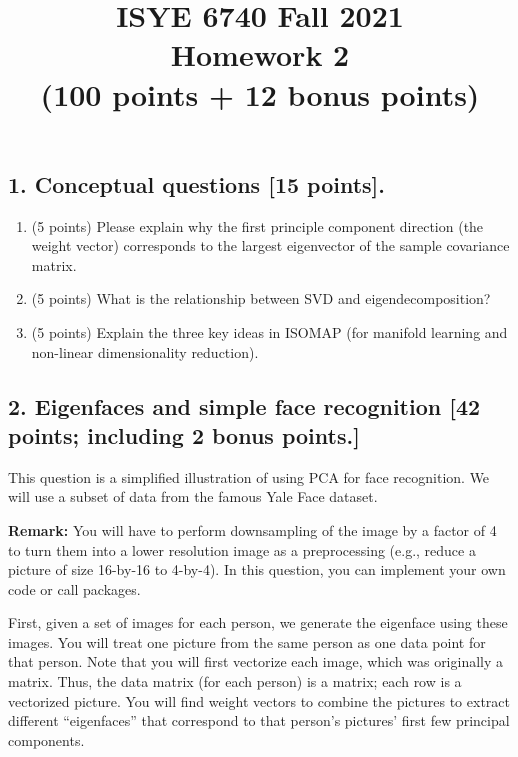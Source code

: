 \documentclass[twoside,10pt]{article}
\begin{document}
\title{ISYE 6740 Fall 2021\\ Homework 2 \\
(100 points + 12 bonus points)}
\date{}

\maketitle


\subsection*{1. Conceptual questions [15 points].}


\begin{enumerate}

\item (5 points) Please explain why the first principle component direction (the weight vector) corresponds to the largest eigenvector of the sample covariance matrix.

\item (5 points) What is the relationship between SVD and eigendecomposition?

\item (5 points) Explain the three key ideas in ISOMAP (for manifold learning and non-linear dimensionality reduction). 

\end{enumerate}



\subsection*{2. Eigenfaces and simple face recognition [42 points; including 2 bonus points.]}

This question is a simplified illustration of using PCA for face recognition. We will use a subset of data from the famous Yale Face dataset. 

\vspace{.1in}
\noindent
{\bf Remark:} You will have to perform downsampling of the image by a factor of 4 to turn them into a lower resolution image as a preprocessing (e.g., reduce a picture of size 16-by-16 to 4-by-4). In this question, you can implement your own code or call packages. 

First, given a set of images for each person, we generate the eigenface using these images. You will treat one picture from the same person as one data point for that person. Note that you will first vectorize each image, which was originally a matrix. Thus, the data matrix (for each person) is a matrix; each row is a vectorized picture. You will find weight vectors to combine the pictures to extract different ``eigenfaces'' that correspond to that person's pictures' first few principal components. 
\end{document}
